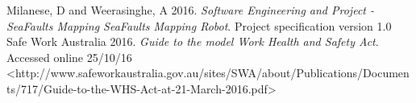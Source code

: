 \documentclass[12pt]{article}
\begin{document}
\begin{thebibliography}{1}

   Milanese, D and Weerasinghe, A 2016. {\em Software Engineering and Project - SeaFaults Mapping SeaFaults Mapping Robot}. Project specification version 1.0
  Safe Work Australia 2016. {\em Guide to the model Work Health and Safety Act}. Accessed online 25/10/16 <http://www.safeworkaustralia.gov.au/sites/SWA/about/Publications/Documents/717/Guide-to-the-WHS-Act-at-21-March-2016.pdf>

  \end{thebibliography}
\end{document}
